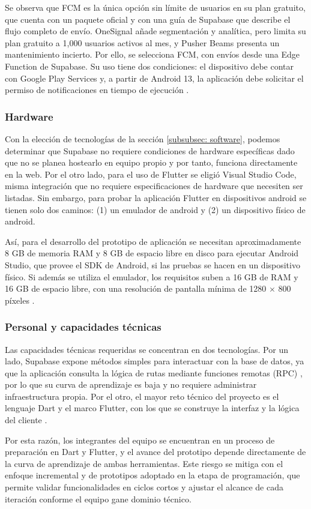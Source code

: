 Se observa que FCM es la única opción sin límite de usuarios en su plan gratuito, que cuenta con un paquete oficial y con una guía de Supabase que describe el flujo completo de envío. OneSignal añade segmentación y analítica, pero limita su plan gratuito a 1,000 usuarios activos al mes, y Pusher Beams presenta un mantenimiento incierto. Por ello, se selecciona FCM, con envíos desde una Edge Function de Supabase. Su uso tiene dos condiciones: el dispositivo debe contar con Google Play Services y, a partir de Android 13, la aplicación debe solicitar el permiso de notificaciones en tiempo de ejecución \cite{firebase_messaging}.

\subsubsection{Hardware}
Con la elección de tecnologías de la sección \ref{subsubsec: software}, podemos determinar que Supabase no requiere condiciones de hardware específicas dado que no se planea hostearlo en equipo propio y por tanto, funciona directamente en la web. Por el otro lado, para el uso de Flutter se eligió Visual Studio Code, misma integración que no requiere especificaciones de hardware que necesiten ser listadas. Sin embargo, para probar la aplicación Flutter en dispositivos android se tienen solo dos caminos: (1) un emulador de android y (2) un dispositivo físico de android.

Así, para el desarrollo del prototipo de aplicación se necesitan aproximadamente 8 GB de memoria RAM y 8 GB de espacio libre en disco para ejecutar Android Studio, que provee el SDK de Android, si las pruebas se hacen en un dispositivo físico. Si además se utiliza el emulador, los requisitos suben a 16 GB de RAM y 16 GB de espacio libre, con una resolución de pantalla mínima de 1280 $\times$ 800 píxeles \cite{androidstudio_install}.

\subsubsection{Personal y capacidades técnicas}
Las capacidades técnicas requeridas se concentran en dos tecnologías. Por un lado, Supabase expone métodos simples para interactuar con la base de datos, ya que la aplicación consulta la lógica de rutas mediante funciones remotas (RPC) \cite{supabase_arquitectura}, por lo que su curva de aprendizaje es baja y no requiere administrar infraestructura propia. Por el otro, el mayor reto técnico del proyecto es el lenguaje Dart y el marco Flutter, con los que se construye la interfaz y la lógica del cliente \cite{supabase_flutter}.

Por esta razón, los integrantes del equipo se encuentran en un proceso de preparación en Dart y Flutter, y el avance del prototipo depende directamente de la curva de aprendizaje de ambas herramientas. Este riesgo se mitiga con el enfoque incremental y de prototipos adoptado en la etapa de programación, que permite validar funcionalidades en ciclos cortos y ajustar el alcance de cada iteración conforme el equipo gane dominio técnico.

